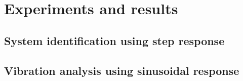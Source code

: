 \section{Experiments and results}

\subsection{System identification using step response}

\subsection{Vibration analysis using sinusoidal response}
